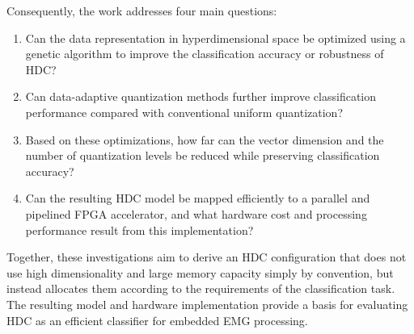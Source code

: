 Consequently, the work addresses four main questions:

\begin{enumerate}
\item Can the data representation in hyperdimensional space be optimized using a genetic algorithm to improve the classification accuracy or robustness of HDC? 

\item Can data-adaptive quantization methods further improve classification performance compared with conventional uniform quantization?

\item Based on these optimizations, how far can the vector dimension and the number of quantization levels be reduced while preserving classification accuracy?

\item Can the resulting HDC model be mapped efficiently to a parallel and pipelined FPGA accelerator, and what hardware cost and processing performance result from this implementation?

\end{enumerate}

Together, these investigations aim to derive an HDC configuration that does not use high dimensionality and large memory capacity simply by convention, but instead allocates them according to the requirements of the classification task. The resulting model and hardware implementation provide a basis for evaluating \ac{HDC} as an efficient classifier for embedded \ac{EMG} processing.